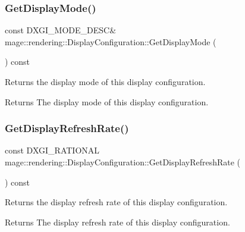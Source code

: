 \subsubsection{\texorpdfstring{Get\+Display\+Mode()}{GetDisplayMode()}}
{\footnotesize\ttfamily const D\+X\+G\+I\+\_\+\+M\+O\+D\+E\+\_\+\+D\+E\+SC\& mage\+::rendering\+::\+Display\+Configuration\+::\+Get\+Display\+Mode (\begin{DoxyParamCaption}{ }\end{DoxyParamCaption}) const\hspace{0.3cm}{\ttfamily [noexcept]}}

Returns the display mode of this display configuration.

\begin{DoxyReturn}{Returns}
The display mode of this display configuration. 
\end{DoxyReturn}
\hypertarget{classmage_1_1rendering_1_1_display_configuration_ae100fc84cd1900e302fb784f429a06b7}{}\label{classmage_1_1rendering_1_1_display_configuration_ae100fc84cd1900e302fb784f429a06b7} 
\subsubsection{\texorpdfstring{Get\+Display\+Refresh\+Rate()}{GetDisplayRefreshRate()}}
{\footnotesize\ttfamily const D\+X\+G\+I\+\_\+\+R\+A\+T\+I\+O\+N\+AL mage\+::rendering\+::\+Display\+Configuration\+::\+Get\+Display\+Refresh\+Rate (\begin{DoxyParamCaption}{ }\end{DoxyParamCaption}) const\hspace{0.3cm}{\ttfamily [noexcept]}}

Returns the display refresh rate of this display configuration.

\begin{DoxyReturn}{Returns}
The display refresh rate of this display configuration. 
\end{DoxyReturn}
\hypertarget{classmage_1_1rendering_1_1_display_configuration_a1394352b2a3f80fb1cc24d96f744ae3c}{}\label{classmage_1_1rendering_1_1_display_configuration_a1394352b2a3f80fb1cc24d96f744ae3c} 
